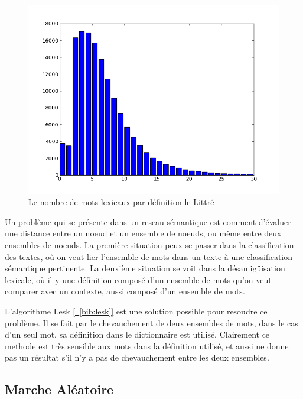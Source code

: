 \begin{figure}
\begin{center}
\includegraphics{Images/words_in_definitions.png}

\caption{Le nombre de mots lexicaux par définition le Littré}
\label{fig:nmotsperentry}
\end{center}
\end{figure}

Un problème qui se présente dans un reseau sémantique est comment d'évaluer une distance
entre un noeud et un ensemble de noeuds, ou même entre deux ensembles de noeuds. La
première situation peux se passer dans la classification des textes, où on veut lier
l'ensemble de mots dans un texte à une classification sémantique pertinente. La
deuxième situation se voit dans la désamigüisation lexicale, où il y une définition
composé d'un ensemble de mots qu'on veut comparer avec un contexte, aussi composé
d'un ensemble de mots.

L'algorithme Lesk \hyperref[bib:lesk]{[~\ref*{bib:lesk}]} est une solution possible pour
resoudre ce problème. Il se fait par le chevauchement de deux ensembles de mots, dans
le cas d'un seul mot, sa définition dans le dictionnaire est utilisé. Clairement ce
methode est très sensible aux mots dans la définition utilisé, et aussi ne donne
pas un résultat s'il n'y a pas de chevauchement entre les deux ensembles. 

\subsection{ Marche Aléatoire }

